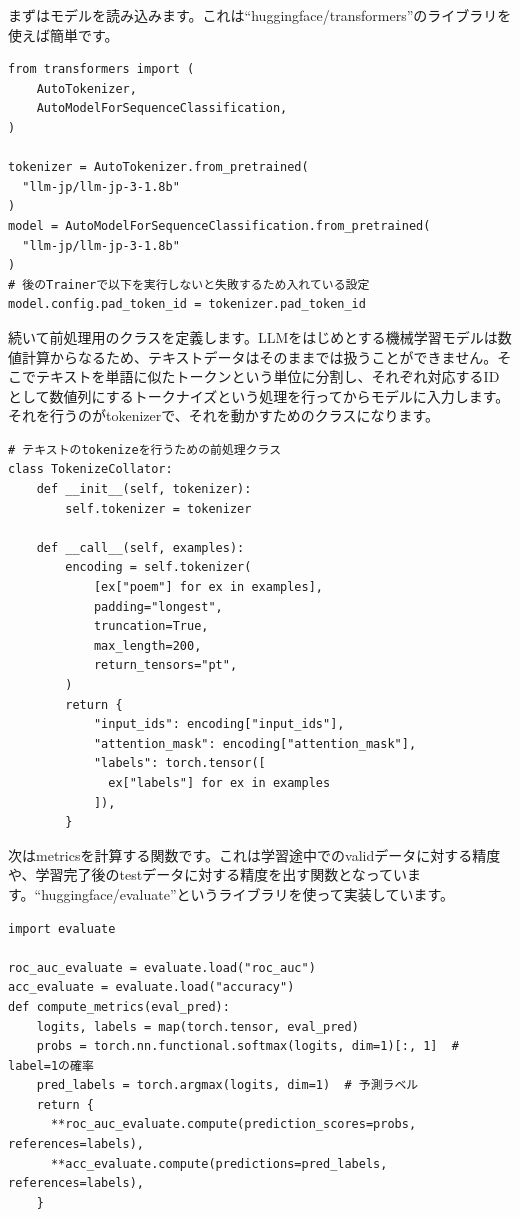 \documentclass[a5paper,twoside,dvipdfmx]{jsarticle}
\begin{document}
まずはモデルを読み込みます。これは``huggingface/transformers''のライブラリを使えば簡単です。

\begin{lstlisting}
from transformers import (
    AutoTokenizer,
    AutoModelForSequenceClassification,
)

tokenizer = AutoTokenizer.from_pretrained(
  "llm-jp/llm-jp-3-1.8b"
)
model = AutoModelForSequenceClassification.from_pretrained(
  "llm-jp/llm-jp-3-1.8b"
)
# 後のTrainerで以下を実行しないと失敗するため入れている設定
model.config.pad_token_id = tokenizer.pad_token_id

\end{lstlisting}

続いて前処理用のクラスを定義します。LLMをはじめとする機械学習モデルは数値計算からなるため、テキストデータはそのままでは扱うことができません。そこでテキストを単語に似たトークンという単位に分割し、それぞれ対応するIDとして数値列にする\textsf{トークナイズ}という処理を行ってからモデルに入力します。それを行うのがtokenizerで、それを動かすためのクラスになります。

\begin{lstlisting}
# テキストのtokenizeを行うための前処理クラス
class TokenizeCollator:
    def __init__(self, tokenizer):
        self.tokenizer = tokenizer

    def __call__(self, examples):
        encoding = self.tokenizer(
            [ex["poem"] for ex in examples],
            padding="longest",
            truncation=True,
            max_length=200,
            return_tensors="pt",
        )
        return {
            "input_ids": encoding["input_ids"],
            "attention_mask": encoding["attention_mask"],
            "labels": torch.tensor([
              ex["labels"] for ex in examples
            ]),
        }

\end{lstlisting}

次はmetricsを計算する関数です。これは学習途中でのvalidデータに対する精度や、学習完了後のtestデータに対する精度を出す関数となっています。``huggingface/evaluate''というライブラリを使って実装しています。

\begin{lstlisting}
import evaluate

roc_auc_evaluate = evaluate.load("roc_auc")
acc_evaluate = evaluate.load("accuracy")
def compute_metrics(eval_pred):
    logits, labels = map(torch.tensor, eval_pred)
    probs = torch.nn.functional.softmax(logits, dim=1)[:, 1]  # label=1の確率
    pred_labels = torch.argmax(logits, dim=1)  # 予測ラベル
    return {
      **roc_auc_evaluate.compute(prediction_scores=probs, references=labels),
      **acc_evaluate.compute(predictions=pred_labels, references=labels),
    }
\end{lstlisting}
\end{document}

